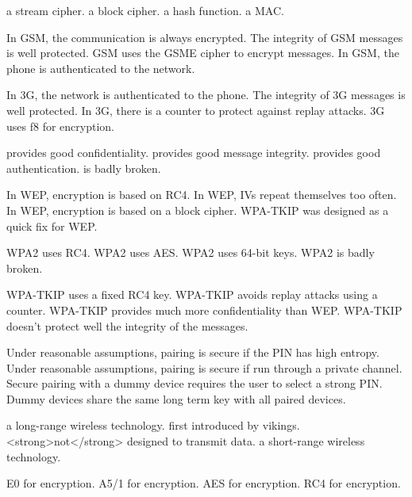 	{a stream cipher.}
	{a block cipher.}
	{a hash function.}
	{a MAC.}
	
	{In GSM, the communication is always encrypted.}
	{The integrity of GSM messages is well protected.}
	{GSM uses the GSME cipher to encrypt messages.}
	{In GSM, the phone is authenticated to the network.}

	{In 3G, the network is authenticated to the phone.}
	{The integrity of 3G messages is well protected.}
	{In 3G, there is a counter to protect against replay attacks.}
	{3G uses f8 for encryption.}

	{provides good confidentiality.}
	{provides good message integrity.}
	{provides good authentication.}
	{is badly broken.}
	
	{In WEP, encryption is based on RC4.}
	{In WEP, IVs repeat themselves too often.}
	{In WEP, encryption is based on a block cipher.}
	{WPA-TKIP was designed as a quick fix for WEP.}

	{WPA2 uses RC4.}
	{WPA2 uses AES.}
	{WPA2 uses 64-bit keys.}
	{WPA2 is badly broken.}

	{WPA-TKIP uses a fixed RC4 key.}
	{WPA-TKIP avoids replay attacks using a counter.}
	{WPA-TKIP provides much more confidentiality than WEP.}
	{WPA-TKIP doesn't protect well the integrity of the messages.}

{Under reasonable assumptions, pairing is secure if the PIN has high entropy.}
{Under reasonable assumptions, pairing is secure if run through a private
channel.}
{Secure pairing with a dummy device requires the user to select a strong
PIN.}
{Dummy devices share the same long term key with all paired devices.}

		{a long-range wireless technology.}
		{first introduced by vikings.}
		{<strong>not</strong> designed to transmit data.}
		{a short-range wireless technology.}

		{E0 for encryption.}
		{A5/1 for encryption.}
		{AES for encryption.}
		{RC4 for encryption.}

